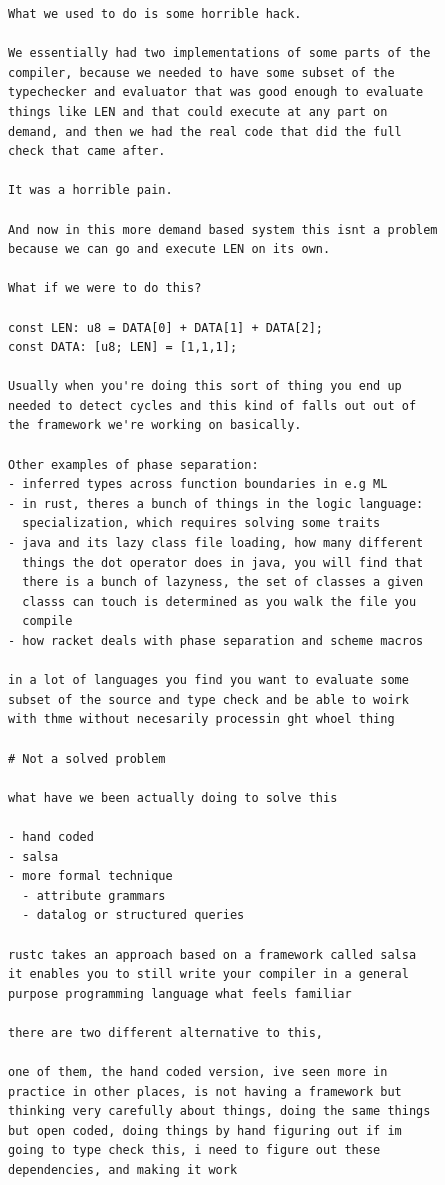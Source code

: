 \documentclass[12pt, a4paper]{report}
\begin{document}
\begin{Verbatim}[fontsize=\small]
What we used to do is some horrible hack.

We essentially had two implementations of some parts of the
compiler, because we needed to have some subset of the
typechecker and evaluator that was good enough to evaluate
things like LEN and that could execute at any part on
demand, and then we had the real code that did the full
check that came after.

It was a horrible pain.

And now in this more demand based system this isnt a problem
because we can go and execute LEN on its own.

What if we were to do this?

const LEN: u8 = DATA[0] + DATA[1] + DATA[2];
const DATA: [u8; LEN] = [1,1,1];

Usually when you're doing this sort of thing you end up
needed to detect cycles and this kind of falls out out of
the framework we're working on basically.

Other examples of phase separation:
- inferred types across function boundaries in e.g ML
- in rust, theres a bunch of things in the logic language:
  specialization, which requires solving some traits
- java and its lazy class file loading, how many different
  things the dot operator does in java, you will find that
  there is a bunch of lazyness, the set of classes a given
  classs can touch is determined as you walk the file you
  compile
- how racket deals with phase separation and scheme macros

in a lot of languages you find you want to evaluate some
subset of the source and type check and be able to woirk
with thme without necesarily processin ght whoel thing

# Not a solved problem

what have we been actually doing to solve this

- hand coded
- salsa
- more formal technique
  - attribute grammars
  - datalog or structured queries

rustc takes an approach based on a framework called salsa
it enables you to still write your compiler in a general
purpose programming language what feels familiar

there are two different alternative to this,

one of them, the hand coded version, ive seen more in
practice in other places, is not having a framework but
thinking very carefully about things, doing the same things
but open coded, doing things by hand figuring out if im
going to type check this, i need to figure out these
dependencies, and making it work


\end{Verbatim}
\end{document}
